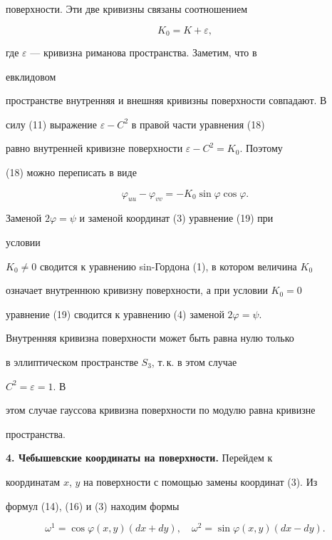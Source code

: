 поверхности. Эти две кривизны связаны соотношением 


$$ 


K_0=K+\varepsilon, 


$$ 


где $\varepsilon$ --- кривизна риманова пространства. Заметим, что в 


евклидовом 


пространстве внутренняя и внешняя кривизны поверхности совпадают. В 


силу (11) выражение $\varepsilon-C^2$ в правой части уравнения (18) 


равно внутренней кривизне поверхности $\varepsilon-C^2=K_0$. Поэтому 


(18) можно переписать в виде 


\begin{equation} 


\varphi_{u u}-\varphi_{v v}=-K_0\sin\varphi\cos\varphi. 


\end{equation} 


Заменой $2\varphi=\psi$ и заменой координат (3) уравнение (19) при 


условии 


$K_0\ne0$ сводится к уравнению sin-Гордона (1), в котором величина $K_0$ 


означает внутреннюю кривизну поверхности, а при условии $K_0=0$ 


уравнение (19) сводится к уравнению (4) заменой $2\varphi=\psi$. 


 


Внутренняя кривизна поверхности может быть равна нулю только 


в эллиптическом пространстве $S_3$, т.\,к. в этом случае 


$C^2=\varepsilon=1$. В 


этом случае гауссова кривизна поверхности по модулю равна кривизне 


пространства. 


\medskip 


 


{\bf 4. Чебышевские координаты на поверхности.} Перейдем к 


координатам $x$, $y$ на поверхности с помощью замены координат (3). Из 


формул (14), (16) и (3) находим формы 


\begin{equation} 


\omega^1=\cos\varphi(x,y)(dx+dy),\quad 


\omega^2=\sin\varphi(x,y)(dx-dy). 


\end{equation} 


